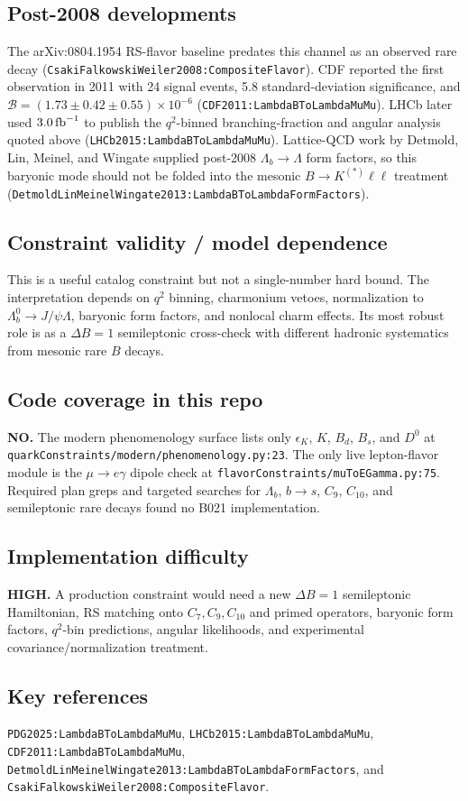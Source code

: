 \subsection*{Post-2008 developments}
The arXiv:0804.1954 RS-flavor baseline predates this channel as an observed
rare decay (\texttt{CsakiFalkowskiWeiler2008:CompositeFlavor}).  CDF reported
the first observation in 2011 with 24 signal events, 5.8 standard-deviation
significance, and
\(\mathcal B=(1.73\pm0.42\pm0.55)\times10^{-6}\)
(\texttt{CDF2011:LambdaBToLambdaMuMu}).  LHCb later used
\(3.0\,{\rm fb}^{-1}\) to publish the \(q^2\)-binned branching-fraction and
angular analysis quoted above
(\texttt{LHCb2015:LambdaBToLambdaMuMu}).  Lattice-QCD work by Detmold, Lin,
Meinel, and Wingate supplied post-2008 \(\Lambda_b\to\Lambda\) form factors,
so this baryonic mode should not be folded into the mesonic
\(B\to K^{(*)}\ell\ell\) treatment
(\texttt{DetmoldLinMeinelWingate2013:LambdaBToLambdaFormFactors}).

\subsection*{Constraint validity / model dependence}
This is a useful catalog constraint but not a single-number hard bound.  The
interpretation depends on \(q^2\) binning, charmonium vetoes, normalization to
\(\Lambda_b^0\to J/\psi\Lambda\), baryonic form factors, and nonlocal charm
effects.  Its most robust role is as a \(\Delta B=1\) semileptonic cross-check
with different hadronic systematics from mesonic rare \(B\) decays.

\subsection*{Code coverage in this repo}
\textbf{NO.}  The modern phenomenology surface lists only
\(\epsilon_K\), \(K\), \(B_d\), \(B_s\), and \(D^0\) at
\texttt{quarkConstraints/modern/phenomenology.py:23}.  The only live
lepton-flavor module is the \(\mu\to e\gamma\) dipole check at
\texttt{flavorConstraints/muToEGamma.py:75}.  Required plan greps and targeted
searches for \(\Lambda_b\), \(b\to s\), \(C_9\), \(C_{10}\), and semileptonic
rare decays found no B021 implementation.

\subsection*{Implementation difficulty}
\textbf{HIGH.}  A production constraint would need a new \(\Delta B=1\)
semileptonic Hamiltonian, RS matching onto \(C_7,C_9,C_{10}\) and primed
operators, baryonic form factors, \(q^2\)-bin predictions, angular likelihoods,
and experimental covariance/normalization treatment.

\subsection*{Key references}
\texttt{PDG2025:LambdaBToLambdaMuMu},
\texttt{LHCb2015:LambdaBToLambdaMuMu},
\texttt{CDF2011:LambdaBToLambdaMuMu},
\texttt{DetmoldLinMeinelWingate2013:LambdaBToLambdaFormFactors}, and
\texttt{CsakiFalkowskiWeiler2008:CompositeFlavor}.
